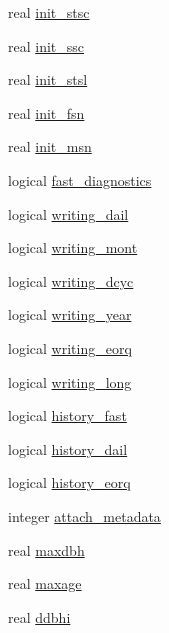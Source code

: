 \begin{DoxyCompactItemize}
\item 
real \hyperlink{namespaceed__misc__coms_affd94ce76afe2ead9503ecc470cf57de}{init\+\_\+stsc}
\item 
real \hyperlink{namespaceed__misc__coms_a543b6b3e043f146ae1f4f4b304ff17f3}{init\+\_\+ssc}
\item 
real \hyperlink{namespaceed__misc__coms_a6ce016d3998f978606f35bc3671ca744}{init\+\_\+stsl}
\item 
real \hyperlink{namespaceed__misc__coms_a9ee49c841b107680ad86ba9c04a768b0}{init\+\_\+fsn}
\item 
real \hyperlink{namespaceed__misc__coms_af130adee8fc32b35d48f85e53e4fa5d1}{init\+\_\+msn}
\item 
logical \hyperlink{namespaceed__misc__coms_a6129d62392dbee90f1cec41a4b29395b}{fast\+\_\+diagnostics}
\item 
logical \hyperlink{namespaceed__misc__coms_a764eed5843c91ba68cb8453f201a5ba1}{writing\+\_\+dail}
\item 
logical \hyperlink{namespaceed__misc__coms_ae91dab0d5d9e096bc630d164c0cf3aca}{writing\+\_\+mont}
\item 
logical \hyperlink{namespaceed__misc__coms_aa4e455b013ba15da273c561474bc6118}{writing\+\_\+dcyc}
\item 
logical \hyperlink{namespaceed__misc__coms_a4a877b72d09710032e8e261e36fdf9d8}{writing\+\_\+year}
\item 
logical \hyperlink{namespaceed__misc__coms_a4e9b25f178cff889c0a1f7c6cc3b0f8c}{writing\+\_\+eorq}
\item 
logical \hyperlink{namespaceed__misc__coms_a907b21c9fa6b3ae894b1fb49d8089935}{writing\+\_\+long}
\item 
logical \hyperlink{namespaceed__misc__coms_acb498f82b7899320d942df34d73ec0ba}{history\+\_\+fast}
\item 
logical \hyperlink{namespaceed__misc__coms_a1f98996eedfb5e2b3f0934e331a17583}{history\+\_\+dail}
\item 
logical \hyperlink{namespaceed__misc__coms_a57aea3af751f0f655977bdd275392f94}{history\+\_\+eorq}
\item 
integer \hyperlink{namespaceed__misc__coms_afb7de717ec53503d518604da7c021e1a}{attach\+\_\+metadata}
\item 
real \hyperlink{namespaceed__misc__coms_a7e0fabd988ab576a04f8e607605cb4d7}{maxdbh}
\item 
real \hyperlink{namespaceed__misc__coms_a33103582327db251ac53c37169379421}{maxage}
\item 
real \hyperlink{namespaceed__misc__coms_addd21c151c013090994c5471206d6595}{ddbhi}

\end{DoxyCompactItemize}
